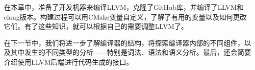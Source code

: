 在本章中，准备了开发机器来编译LLVM，克隆了GitHub库，并编译了LLVM和clang版本。构建过程可以用CMake变量自定义，了解了有用的变量以及如何更改它们。有了这些知识，就可以根据自己的需要调整LLVM了。

在下一节中，我们将进一步了解编译器的结构，将探索编译器内部的不同组件，以及其中发生的不同类型的分析——特别是词法、语法和语义分析。最后，还会简要介绍使用LLVM后端进行代码生成的接口。